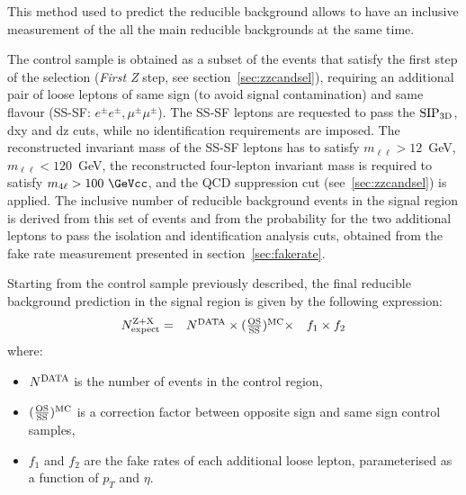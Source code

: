 
This method used to predict the reducible background allows to
have an inclusive measurement of the all the main reducible
backgrounds at the same time.

The control sample is obtained as a subset of the events that satisfy
the first step of the selection ({\it First Z} step, see
section~\ref{sec:zzcandsel}), requiring an additional pair of 
loose leptons of same sign (to avoid signal contamination) and same
flavour (SS-SF: $e^{\pm}e^{\pm}, \mu^{\pm}\mu^{\pm}$).  The SS-SF
leptons are requested to pass the ${\rm SIP_{3D}}$, dxy and dz cuts, while no
identification requirements are imposed.  The
reconstructed invariant mass of the SS-SF leptons has to satisfy 
$m_{ \ell \ell} > 12$~GeV, $m_{ \ell \ell} < 120$~GeV,
the reconstructed four-lepton
invariant mass is required to satisfy $m_{4\ell} > 100~\GeVcc$,
and the QCD suppression cut (see~\ref{sec:zzcandsel}) is applied.
The inclusive number of reducible background events in the
signal region is derived from this set of events and from the probability for the
two additional leptons to pass the isolation and identification
analysis cuts, obtained from the fake rate measurement presented in section~\ref{sec:fakerate}.

Starting from the control sample previously described, the final
reducible background prediction in the signal region is given by the
following expression:
\begin{equation} 
\label{eq:FakeRateAA}
\begin{array}{cccc}
N^{\rm Z+X}_{\rm expect}  = & N^{\rm DATA}  \times   \rm{(\frac {OS}{SS})^{MC}}   \times &  
 f_1 \times f_2 
\end{array} 
\end{equation} 
where:
%
\begin{itemize}
\item $N^{\rm DATA}$ is the number of events in the control region,
\item $\rm{(\frac {OS}{SS})^{MC}}$ is a correction factor between opposite sign and same sign control samples,
\item $f_1$ and $f_2$ are the fake rates of each additional loose lepton, parameterised as a
   function of $p_T$ and $\eta$.
\end{itemize}


